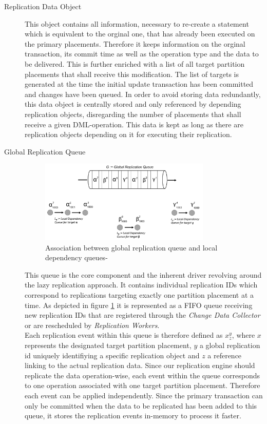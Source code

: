 \begin{description}

    \item[Replication Data Object] This object contains all information, necessary to re-create a statement which is equivalent to the orginal one,
    that has already been executed on the primary placements. 
    Therefore it keeps information on the orginal transaction, its commit time as well as the operation type and the data to be delivered. 
    This is further enriched with a list of all target partition placements that shall receive this modification. The list of targets is generated
    at the time the initial update transaction has been committed and changes have been queued. In order to avoid storing data redundantly, this data object 
    is centrally stored and only referenced by depending replication objects, disregarding the number of placements that shall receive a given DML-operation.
    This data is kept as long as there are replication objects depending on it for executing their replication.


    \item[Global Replication Queue] 
    
    \begin{figure}[t]
        \centering
        \includegraphics[width=0.8\textwidth]{Figures/Queue.png}
        \caption{Association between global replication queue and local dependency queues-}
        \label{fig:queue}
    \end{figure}
  
    This queue is the core component and the inherent driver revolving around the lazy replication approach. 
    It contains individual replication IDs which correspond to replications targeting exactly one partition placement at a time.
    As depicted in figure \ref{fig:queue} it is represented as a FIFO queue receiving new replication IDs that are registered through the \emph{Change Data Collector} 
    or are rescheduled by \emph{Replication Workers}.\\
    Each replication event within this queue is therefore defined as $x_{z}^y$, where $x$ represents the designated target partition placement, $y$ a global
    replication id uniquely identifiying a specific replication object and $z$ a reference linking to the actual replication data. 
    Since our replication engine should replicate the data operation-wise, each event within the queue corresponds to one operation associated with one target partition placement.
    Therefore each event can be applied independently. Since the primary transaction can only be committed when the data to be replicated has been added to this queue,
    it stores the replication events in-memory to process it faster.


\end{description}
